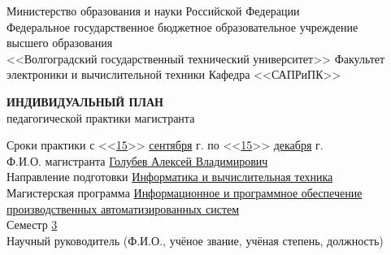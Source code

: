 \documentclass[a4paper, 14pt]{extreport}
\begin{document}
    \onehalfspacing
    \begin{titlepage}
        \begin{center}
            Министерство образования и науки Российской Федерации\\
            Федеральное государственное бюджетное образовательное учреждение\\
            высшего образования\\
            <<Волгоградский государственный технический университет>>
            Факультет электроники и вычислительной техники
            Кафедра <<САПРиПК>>
        \end{center}
        \vspace{2cm}
        \begin{center}
            \large \textbf{ИНДИВИДУАЛЬНЫЙ ПЛАН} \\
            педагогической практики магистранта
        \end{center}
        \vspace{2cm}
        Сроки практики с <<\underline{15}>> \underline{сентября} \the\year г. 
        по <<\underline{15}>> \underline{декабря} \the\year г.\\
        Ф.И.О. магистранта \underline{Голубев Алексей Владимирович\hspace{10.7em}} \\
        Направление подготовки \underline{Информатика и вычислительная техника\hspace{4.9em}} \\
        Магистерская программа \underline{Информационное и программное обеспечение\hspace{2.3em}}\\
        \underline{производственных автоматизированных систем\hspace{13em}} \\
        Семестр \underline{\hspace{1cm}3\hspace{1cm}} \\

        \noindent Научный руководитель (Ф.И.О., учёное звание, учёная степень, должность)\\
        \underline{\hspace{\textwidth}}\\
        \underline{\hspace{\textwidth}}\\
        \underline{\hspace{\textwidth}}
    \end{titlepage}
\end{document}
